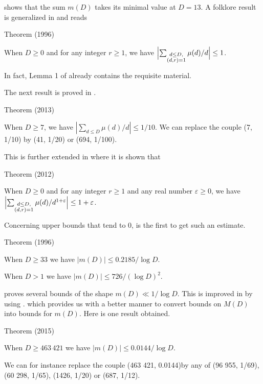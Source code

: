 \cite{MacLeod*69} shows that the sum
$m(D)$ takes its minimal value at $D=13$.
A folklore result is generalized in 
\cite{Granville-Ramare*96} and reads
\begin{thm}{Theorem (1996)}

When $D\ge 0$ and for any integer $r\ge1$, we have $\Bigl|\sum_{\substack{d\le D,\\
(d,r)=1}}\mu(d)/d\Bigr|\le 1$.
\end{thm}

In fact, Lemma 1 of \cite{Davenport*37-1} already
contains the requisite material.

The next result is proved in
\cite{Ramare*12-5}.
\begin{thm}{Theorem (2013)}

When $D\ge 7$, we have $|\sum_{d\le D}\mu(d)/d|\le 1/10$. We can
replace the couple (7, 1/10) by (41, 1/20) or (694, 1/100).
\end{thm}


This is further extended in
\cite{Ramare*12-4} where it is shown
that
\begin{thm}{Theorem (2012)}

When $D\ge 0$ and for any integer $r\ge1$ and any real number $\varepsilon\ge0$, we have $\Bigl|\sum_{\substack{d\le D,\\
(d,r)=1}}\mu(d)/d^{1+\varepsilon}\Bigr|\le 1+\varepsilon$.
\end{thm}



Concerning upper bounds that tend to $0$, 
\cite{ElMarraki*96}
is the first to get such an estimate.
\begin{thm}{Theorem (1996)}

When $D\ge33$ we have $|m(D)|\le 0.2185/\log D$.


When $D > 1$ we have $|m(D)|\le 726/(\log D)^2$.
\end{thm}


\cite{Ramare*12-2} proves several
bounds of the shape $m(D)\ll 1/\log D$.
This is improved in
\cite{Ramare*12-5} by using
\cite{Balazard*12}.
which provides us with a better manner to convert bounds on $M(D)$
into bounds for $m(D)$. Here is one result obtained.

\begin{thm}{Theorem (2015)}

When $D\ge 463\,421$ we have $|m(D)|\le 0.0144/\log D$.

  We can for instance replace the couple  (463 421, 0.0144)by
any of  (96 955, 1/69), (60 298, 1/65), (1426, 1/20)
or (687, 1/12).
\end{thm}




